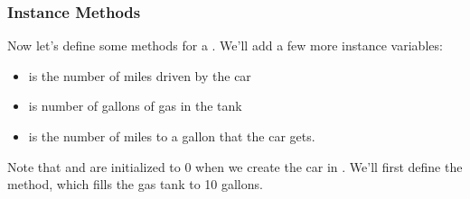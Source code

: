 \documentclass[letterpaper,10pt,english]{jupyterBook}
\begin{document}
\begin{sphinxVerbatim}[commandchars=\\\{\}]
  
  

        
        
\end{sphinxVerbatim}


\subsubsection{Instance Methods}
\label{\detokenize{content/07-game-theory/python-classes:instance-methods}}
\sphinxAtStartPar
Now let’s define some methods for a . We’ll add a few more instance variables:
\begin{itemize}
\item {} 
\sphinxAtStartPar
{} is the number of miles driven by the car

\item {} 
\sphinxAtStartPar
{} is number of gallons of gas in the tank

\item {} 
\sphinxAtStartPar
{} is the number of miles to a gallon that the car gets.

\end{itemize}

\sphinxAtStartPar
Note that  and  are initialized to 0 when we create the car in . We’ll first define the  method, which fills the gas tank to 10 gallons.
\end{document}
